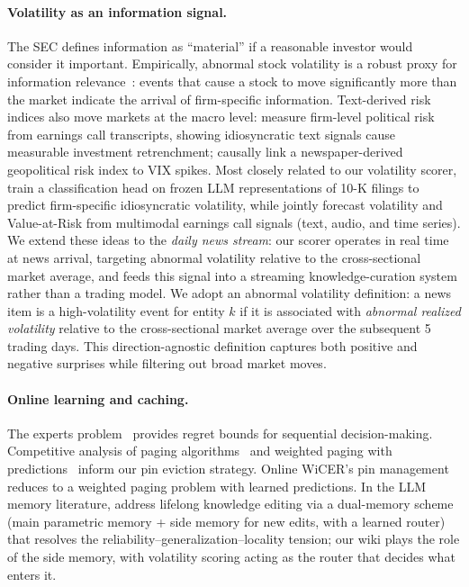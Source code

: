 \documentclass{article}
\begin{document}
\paragraph{Volatility as an information signal.}
The SEC defines information as ``material'' if a reasonable investor would consider it important.
Empirically, abnormal stock volatility is a robust proxy for information relevance~\citep{khan2016materiality, grewal2019material}: events that cause a stock to move significantly more than the market indicate the arrival of firm-specific information.
Text-derived risk indices also move markets at the macro level: \citet{hassan2019political} measure firm-level political risk from earnings call transcripts, showing idiosyncratic text signals cause measurable investment retrenchment; \citet{caldara2022geopolitical} causally link a newspaper-derived geopolitical risk index to VIX spikes.
Most closely related to our volatility scorer, \citet{zhao2025llmrisk} train a classification head on frozen LLM representations of 10-K filings to predict firm-specific idiosyncratic volatility, while \citet{cao2024risklabs} jointly forecast volatility and Value-at-Risk from multimodal earnings call signals (text, audio, and time series).
We extend these ideas to the \emph{daily news stream}: our scorer operates in real time at news arrival, targeting abnormal volatility relative to the cross-sectional market average, and feeds this signal into a streaming knowledge-curation system rather than a trading model.
We adopt an abnormal volatility definition: a news item is a high-volatility event for entity $k$ if it is associated with \emph{abnormal realized volatility} relative to the cross-sectional market average over the subsequent 5 trading days.
This direction-agnostic definition captures both positive and negative surprises while filtering out broad market moves.

\paragraph{Online learning and caching.}
The experts problem~\citep{cesa2006prediction, hazan2016introduction} provides regret bounds for sequential decision-making.
Competitive analysis of paging algorithms~\citep{fiat1998competitive} and weighted paging with predictions~\citep{bansal2012weighted} inform our pin eviction strategy.
Online WiCER's pin management reduces to a weighted paging problem with learned predictions.
In the LLM memory literature, \citet{wang2024wise} address lifelong knowledge editing via a dual-memory scheme (main parametric memory + side memory for new edits, with a learned router) that resolves the reliability--generalization--locality tension; our wiki plays the role of the side memory, with volatility scoring acting as the router that decides what enters it.
\end{document}
